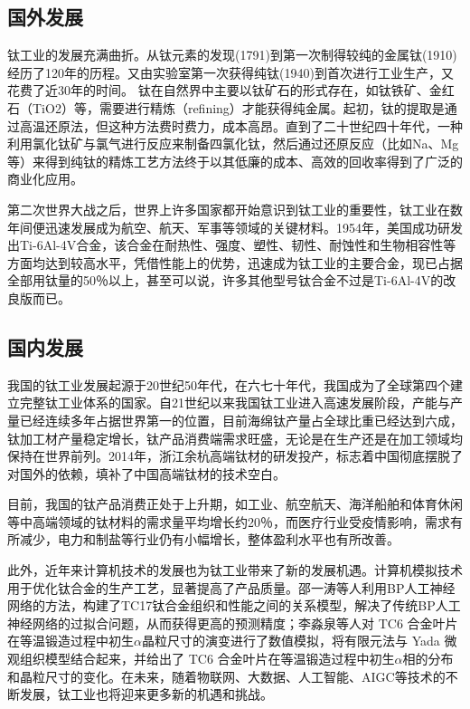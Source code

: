 \subsection{国外发展}
钛工业的发展充满曲折。从钛元素的发现(1791)到第一次制得较纯的金属钛(1910)经历了120年的历程。又由实验室第一次获得纯钛(1940)到首次进行工业生产，又花费了近30年的时间。
钛在自然界中主要以钛矿石的形式存在，如钛铁矿、金红石（TiO2）等，需要进行精炼（refining）才能获得纯金属。起初，钛的提取是通过高温还原法，但这种方法费时费力，成本高昂。直到了二十世纪四十年代，一种利用氯化钛矿与氯气进行反应来制备四氯化钛，然后通过还原反应（比如Na、Mg等）来得到纯钛的精炼工艺方法终于以其低廉的成本、高效的回收率得到了广泛的商业化应用。

第二次世界大战之后，世界上许多国家都开始意识到钛工业的重要性，钛工业在数年间便迅速发展成为航空、航天、军事等领域的关键材料。1954年，美国成功研发出Ti-6Al-4V合金，该合金在耐热性、强度、塑性、韧性、耐蚀性和生物相容性等方面均达到较高水平，凭借性能上的优势，\ti 迅速成为钛工业的主要合金，现已占据全部用钛量的50％以上，甚至可以说，许多其他型号钛合金不过是Ti-6Al-4V的改良版而已\cite{COLO200102000}。

\subsection{国内发展}
我国的钛工业发展起源于20世纪50年代，在六七十年代，我国成为了全球第四个建立完整钛工业体系的国家。自21世纪以来我国钛工业进入高速发展阶段，产能与产量已经连续多年占据世界第一的位置，目前海绵钛产量占全球比重已经达到六成，钛加工材产量稳定增长，钛产品消费端需求旺盛\cite{JSTB202209001}，无论是在生产还是在加工领域均保持在世界前列。2014年，浙江余杭高端钛材的研发投产，标志着中国彻底摆脱了对国外的依赖，填补了中国高端钛材的技术空白。\cite{TGYJ200405004}

目前，我国的钛产品消费正处于上升期，如工业、航空航天、海洋船舶和体育休闲等中高端领域的钛材料的需求量平均增长约20％，而医疗行业受疫情影响，需求有所减少，电力和制盐等行业仍有小幅增长，整体盈利水平也有所改善\cite{BJKY202204004}。

此外，近年来计算机技术的发展也为钛工业带来了新的发展机遇。计算机模拟技术用于优化钛合金的生产工艺，显著提高了产品质量。邵一涛等人利用BP人工神经网络的方法，构建了TC17钛合金组织和性能之间的关系模型，解决了传统BP人工神经网络的过拟合问题，从而获得更高的预测精度\cite{BP}；李淼泉等人对 TC6 合金叶片在等温锻造过程中初生$\alpha$晶粒尺寸的演变进行了数值模拟\cite{Moni}，将有限元法与 Yada 微观组织模型结合起来，并给出了 TC6 合金叶片在等温锻造过程中初生$\alpha$相的分布和晶粒尺寸的变化。在未来，随着物联网、大数据、人工智能、AIGC等技术的不断发展，钛工业也将迎来更多新的机遇和挑战。
